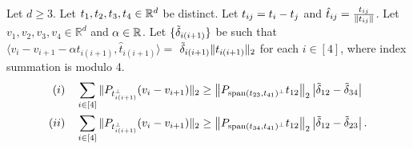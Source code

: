\begin{lemma} \label{lem:rigidity4}
Let $d\ge3$. Let $t_{1},t_{2},t_{3},t_{4} \in \mathbb{R}^d$ be distinct.  Let $t_{ij} = t_{i} - t_{j}$ and $\hat{t}_{ij} = \frac{t_{ij}}{\| t_{ij} \|}$.  Let $v_{1},v_{2},v_{3},v_{4}\in\mathbb{R}^{d}$ and $\alpha \in \mathbb{R}$.   Let $\{\tilde{\delta}_{i(i+1)}\}$ be such that  ${\langle v_{i}-v_{i+1}-\alpha t_{i(i+1)},\hat{t}_{i(i+1)}\rangle=}$ $\tilde{\delta}_{i(i+1)}\|t_{i(i+1)}\|_2$ for each $i\in[4]$, where index summation is modulo 4.
\begin{align*}
(i) \quad &\sum_{i\in[4]} 
	\|P_{t_{i(i+1)}^{\perp}}(v_{i}-v_{i+1})\|_2
	\ge \left\| P_{\operatorname{span}(t_{23},t_{41})^{\perp}}t_{12}\right\|_2 \left|\tilde{\delta}_{12}-\tilde{\delta}_{34}\right| \\
(ii) \quad &\sum_{i\in[4]} 
	\|P_{t_{i(i+1)}^{\perp}}(v_{i}-v_{i+1})\|_2
	\ge  \left\| P_{\operatorname{span}(t_{34},t_{41})^{\perp}} t_{12}\right\|_2 \left|\tilde{\delta}_{12}-\tilde{\delta}_{23}\right|.
\end{align*}
\end{lemma}
